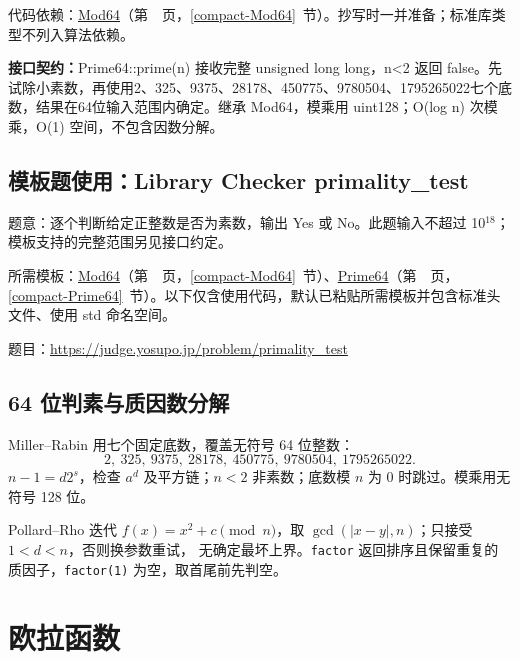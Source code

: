 代码依赖：\hyperref[compact-Mod64]{Mod64}（第~\pageref{compact-Mod64}~页，\ref{compact-Mod64}~节）。抄写时一并准备；标准库类型不列入算法依赖。

{\sloppy{}\noindent\textbf{接口契约：}Prime64::prime(n) 接收完整 unsigned long long，n<2 返回 false。先试除小素数，再使用2、325、9375、28178、450775、9780504、1795265022七个底数，结果在64位输入范围内确定。继承 Mod64，模乘用 uint128；O(log n) 次模乘，O(1) 空间，不包含因数分解。\par}



\Needspace{302pt}

\subsection*{模板题使用：Library Checker primality\_test}

\label{usage-example-13}

题意：逐个判断给定正整数是否为素数，输出 Yes 或 No。此题输入不超过 10$^{18}$；模板支持的完整范围另见接口约定。

所需模板：\hyperref[compact-Mod64]{Mod64}（第~\pageref{compact-Mod64}~页，\ref{compact-Mod64}~节）、\hyperref[compact-Prime64]{Prime64}（第~\pageref{compact-Prime64}~页，\ref{compact-Prime64}~节）。以下仅含使用代码，默认已粘贴所需模板并包含标准头文件、使用 std 命名空间。

题目：\url{https://judge.yosupo.jp/problem/primality_test}



\subsection{64 位判素与质因数分解}\label{knowledge-miller-bounds}
Miller--Rabin 用七个固定底数，覆盖无符号 64 位整数：
\[
2,\ 325,\ 9375,\ 28178,\ 450775,\ 9780504,\ 1795265022.
\]
$n-1=d2^s$，检查 $a^d$ 及平方链；$n<2$ 非素数；底数模 $n$ 为 0 时跳过。模乘用无符号 128 位。

Pollard--Rho 迭代 $f(x)=x^2+c\pmod n$，取 $\gcd(|x-y|,n)$；只接受 $1<d<n$，否则换参数重试，
无确定最坏上界。\texttt{factor} 返回排序且保留重复的质因子，\texttt{factor(1)} 为空，取首尾前先判空。



\Needspace{530pt}

\section{欧拉函数}

